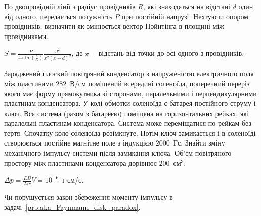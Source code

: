 \begin{problem}
    По двопровідній лінії з радіус провідників $R$, які знаходяться на відстані $d$ один від одного, передається потужність $P$ при постійній напрузі. Нехтуючи опором провідників, визначити як змінюється вектор Пойнтінга в площині між провідниками. 
\begin{solution}
	$S  = \frac{P}{4\pi\ln\left( \frac{d}{R} \right) } \frac{d^2}{x^2\left( x - d\right)^2 }$, де $x$~-- відстань від точки до осі одного з провідників.
\end{solution}
\end{problem}


\begin{problem}\label{prb:KRS3.191}
Заряджений плоский повітряний конденсатор з напруженістю електричного поля між пластинами $282$~В/см поміщений всередині соленоїда, поперечний переріз якого має форму прямокутника зі сторонами, паралельними і перпендикулярними пластинам конденсатора. У колі обмотки соленоїда є батарея постійного струму і ключ. Вся система (разом з батареєю) поміщена на горизонтальних рейках, які паралельні пластинам конденсатора. Система може переміщатися по рейкам без тертя. Спочатку коло соленоїда розімкнуте. Потім ключ замикається і в соленоїді створюється постійне магнітне поле з індукцією $2000$~Гс. Знайти зміну механічного імпульсу системи після замикання ключа. Об'єм повітряного простору між пластинами конденсатора дорівнює $200$~см$^3$.
\begin{solution}
	$\Delta p = \frac{EB}{2\pi c}V = 10^{-6}$~г$\cdot$см/с.
\end{solution}
\end{problem}


\begin{problem}
    Чи порушується закон збереження моменту імпульсу в задачі~\ref{prb:aka_Faynmann_disk_paradox}.
\end{problem}


